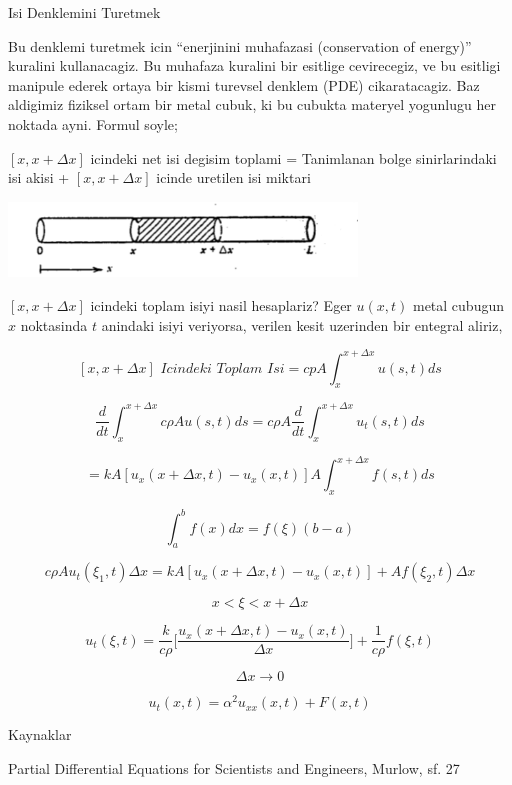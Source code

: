 \documentclass[12pt,fleqn]{article}
\begin{document}
Isi Denklemini Turetmek 

Bu denklemi turetmek icin ``enerjinini muhafazasi (conservation of
energy)'' kuralini kullanacagiz. Bu muhafaza kuralini bir esitlige
cevirecegiz, ve bu esitligi manipule ederek ortaya bir kismi turevsel
denklem (PDE) cikaratacagiz. Baz aldigimiz fiziksel ortam bir metal cubuk,
ki bu cubukta materyel yogunlugu her noktada ayni.  Formul soyle;

$[x,x+\Delta x]$ icindeki net isi degisim toplami = Tanimlanan bolge
sinirlarindaki isi akisi + $[x,x+\Delta x]$ icinde uretilen isi miktari

\includegraphics[height=2cm]{heat_1.png}

$[x,x+\Delta x]$ icindeki toplam isiyi nasil hesaplariz? Eger $u(x,t)$
metal cubugun $x$ noktasinda $t$ anindaki isiyi veriyorsa, verilen kesit
uzerinden bir entegral aliriz,

\[ [x,x+\Delta x] \textit{ Icindeki Toplam Isi} = 
cpA \int _{ x}^{x+\Delta x}u(s,t) ds
   \]



\[ \frac{d}{dt} \int _{ x}^{x+\Delta x} c\rho A u(s,t) ds = 
c\rho A  \frac{d}{dt} \int _{ x}^{x+\Delta x} u_t(s,t) ds
  \]


\[ = kA [ u_x(x+\Delta x,t) - u_x(x,t)] A \int _{x}^{x+\Delta x} f(s,t) ds \]

\[ \int _{ a}^{b} f(x) dx = f(\xi)(b-a)  \]

\[ c\rho A u_t(\xi_1,t)\Delta x = 
kA[u_x(x+\Delta x, t) - u_x(x,t)] + 
Af(\xi_2,t)\Delta x
 \]


\[ x < \xi < x+\Delta x \]

\[ u_t(\xi,t) = 
\frac{k}{c\rho} \bigg[
\frac{u_x(x+\Delta x,t) - u_x(x,t)}
{\Delta x}
\bigg]
+ \frac{ 1}{c\rho}f(\xi,t)
 \]

\[ \Delta x \to 0 \]

\[ u_t(x,t) = \alpha^2u_{xx}(x,t) + F(x,t) \]


Kaynaklar

Partial Differential Equations for Scientists and Engineers, Murlow, sf. 27
\end{document}
